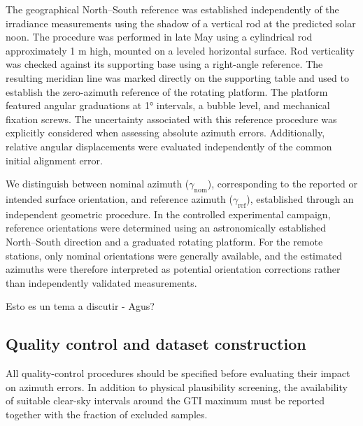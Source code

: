 The geographical North–South reference was established independently of the irradiance measurements using the shadow of a vertical rod at the predicted solar noon. The procedure was performed in late May using a cylindrical rod approximately 1 m high, mounted on a leveled horizontal surface. Rod verticality was checked against its supporting base using a right-angle reference.
The resulting meridian line was marked directly on the supporting table and used to establish the zero-azimuth reference of the rotating platform. The platform featured angular graduations at 1° intervals, a bubble level, and mechanical fixation screws.
The uncertainty associated with this reference procedure was explicitly considered when assessing absolute azimuth errors. Additionally, relative angular displacements were evaluated independently of the common initial alignment error.


We distinguish between nominal azimuth ($\gamma_{\mathrm{nom}}$), corresponding to the reported or intended surface orientation, and reference azimuth ($\gamma_{\mathrm{ref}}$), established through an independent geometric procedure. In the controlled experimental campaign, reference orientations were determined using an astronomically established North–South direction and a graduated rotating platform. For the remote stations, only nominal orientations were generally available, and the estimated azimuths were therefore interpreted as potential orientation corrections rather than independently validated measurements.

Esto es un tema a discutir - Agus?


\subsection{Quality control and dataset construction}
\label{subsec:datasetqc}
All quality-control procedures should be specified before evaluating their
impact on azimuth errors. In addition to physical plausibility screening, the
availability of suitable clear-sky intervals around the GTI maximum must be
reported together with the fraction of excluded samples.


